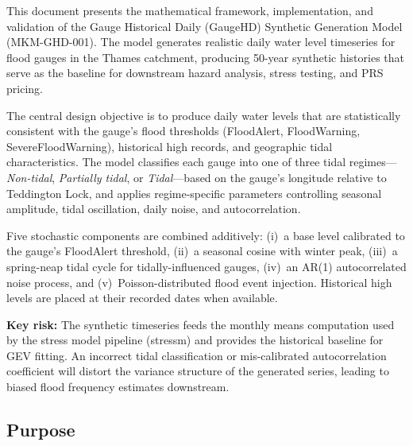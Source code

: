 \documentclass[11pt,a4paper]{article}
\begin{document}
\mkmtitlepage
\mkmlegalpage
\tableofcontents
\clearpage

\mkmexecsummary

This document presents the mathematical framework, implementation, and validation of the
Gauge Historical Daily (GaugeHD) Synthetic Generation Model (MKM-GHD-001). The model
generates realistic daily water level timeseries for flood gauges in the Thames catchment,
producing 50-year synthetic histories that serve as the baseline for downstream hazard
analysis, stress testing, and PRS pricing.

The central design objective is to produce daily water levels that are statistically
consistent with the gauge's flood thresholds (FloodAlert, FloodWarning, SevereFloodWarning),
historical high records, and geographic tidal characteristics. The model classifies each
gauge into one of three tidal regimes---\emph{Non-tidal}, \emph{Partially tidal}, or
\emph{Tidal}---based on the gauge's longitude relative to Teddington Lock, and applies
regime-specific parameters controlling seasonal amplitude, tidal oscillation, daily noise,
and autocorrelation.

Five stochastic components are combined additively: (i)~a base level calibrated to the
gauge's FloodAlert threshold, (ii)~a seasonal cosine with winter peak, (iii)~a spring-neap
tidal cycle for tidally-influenced gauges, (iv)~an AR(1) autocorrelated noise process, and
(v)~Poisson-distributed flood event injection. Historical high levels are placed at their
recorded dates when available.

\textbf{Key risk:} The synthetic timeseries feeds the monthly means computation used by the
stress model pipeline (stressm) and provides the historical baseline for GEV fitting. An
incorrect tidal classification or mis-calibrated autocorrelation coefficient will distort
the variance structure of the generated series, leading to biased flood frequency estimates
downstream.

\mkmpurpose

\subsection{Purpose}
\end{document}
